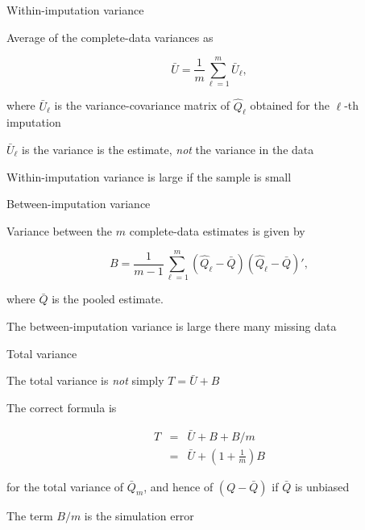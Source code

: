 \documentclass[ignorenonframetext,aspectratio=43]{beamer}
\begin{document}
\begin{frame}{Within-imputation variance}
\protect\hypertarget{within-imputation-variance}{}

Average of the complete-data variances as

\[
  \bar U = \frac{1}{m}\sum_{\ell=1}^m \bar U_\ell,
\]

where \(\bar U_\ell\) is the variance-covariance matrix of
\(\hat Q_\ell\) obtained for the \(\ell\)-th imputation

\(\bar U_\ell\) is the variance is the estimate, \emph{not} the variance
in the data

Within-imputation variance is large if the sample is small

\end{frame}

\begin{frame}{Between-imputation variance}
\protect\hypertarget{between-imputation-variance}{}

Variance between the \(m\) complete-data estimates is given by

\[
B = \frac{1}{m-1}\sum_{\ell=1}^m (\hat Q_\ell-\bar Q)(\hat Q_\ell-\bar Q)',
\]

where \(\bar Q\) is the pooled estimate.

The between-imputation variance is large there many missing data

\end{frame}

\begin{frame}{Total variance}
\protect\hypertarget{total-variance}{}

The total variance is \emph{not} simply \(T=\bar U + B\)

The correct formula is

\begin{eqnarray}
  T & = & \bar U + B + B/m \nonumber \\
      & = & \bar U + \left(1+\frac{1}{m}\right)B
\end{eqnarray}

for the total variance of \(\bar Q_m\), and hence of \((Q-\bar Q)\) if
\(\bar Q\) is unbiased

The term \(B/m\) is the simulation error

\end{frame}
\end{document}
